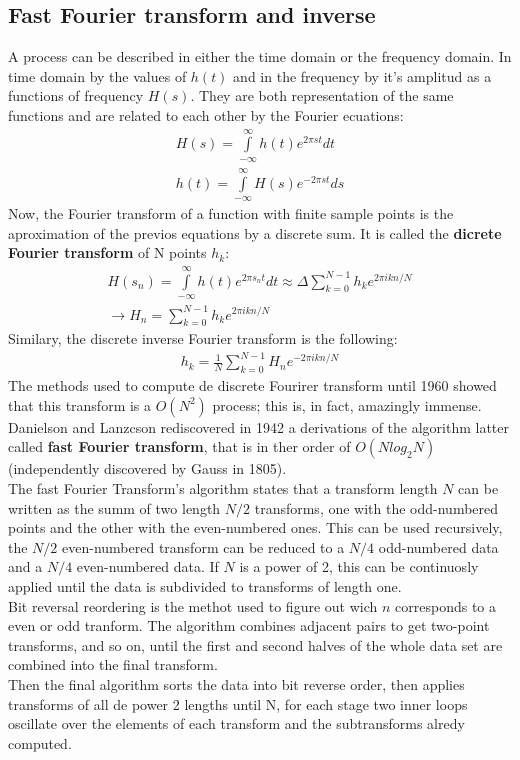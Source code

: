 \documentclass[letterpaper]{article}
\begin{document}
\subsection{Fast Fourier transform and inverse}
A process can be described in either the time domain or the frequency domain. In time domain by the values of $h(t)$ and in the frequency by it's amplitud as a functions of frequency $H(s)$. They are both representation of the same functions and are related to each other by the Fourier ecuations:
\begin{align}
	H(s)= \int\limits_{-\infty}^\infty h(t) e^{2\pi st} dt \\
    h(t)= \int\limits_{-\infty}^\infty H(s) e^{-2\pi st} ds
\end{align}
Now, the Fourier transform of a function with finite sample points is the aproximation of the previos equations by a discrete sum. It is called the \textbf{dicrete Fourier transform} of N points $h_k$:
\begin{align}
	H(s_n)=\int\limits_{-\infty}^\infty h(t) e^{2\pi s_n t} dt \approx \Delta \sum_{k=0}^{N-1} h_k e^{2\pi i k n /N} \\
    \rightarrow H_n=\sum_{k=0}^{N-1} h_k e^{2\pi i k n /N}
\end{align}
Similary, the discrete inverse Fourier transform is the following:
\begin{align}
	h_k= \frac{1}{N} 	\sum_{k=0}^{N-1} H_n e^{-2\pi i k n /N}
\end{align}
The methods used to compute de discrete Fourirer transform until 1960 showed that this transform is a $O(N^2)$ process; this is, in fact, amazingly immense. Danielson and Lanzcson rediscovered in 1942 a derivations of the algorithm latter called \textbf{fast Fourier transform}, that is in ther order of $O(N log_2 N)$ (independently discovered by Gauss in 1805). \\
The fast Fourier Transform's algorithm states that a transform length $N$ can be written as the summ of two length $N/2$ transforms, one with the odd-numbered points and the other with the even-numbered ones. This can be used recursively, the $N/2$ even-numbered transform can be reduced to a $N/4$ odd-numbered data and a $N/4$ even-numbered data. If $N$ is a power of 2, this can be continuosly applied until the data is subdivided to transforms of length one.\\ 
Bit reversal reordering is the methot used to figure out wich $n$ corresponds to a even or odd tranform. The algorithm combines adjacent pairs to get two-point transforms, and so on, until the first and second halves of the whole data set are combined into the final transform.\\
Then the final algorithm sorts the data into bit reverse order, then applies transforms of all de power 2 lengths until N, for each stage  two inner loops oscillate over the elements of each transform and the subtransforms alredy computed.
\end{document}
